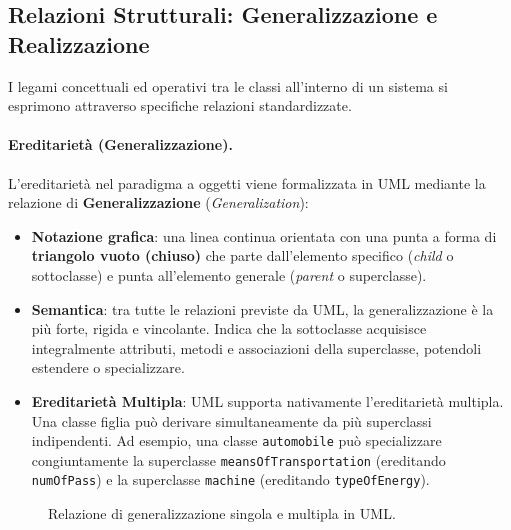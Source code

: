 \documentclass[12pt]{extarticle}
\newcommand{\cn}[1]{\makebox[\linewidth][c]{\textbf{#1}}}
\begin{document}
\newpage

\subsection{Relazioni Strutturali: Generalizzazione e Realizzazione}

\noindent I legami concettuali ed operativi tra le classi all'interno di un sistema si esprimono attraverso specifiche relazioni standardizzate.

\paragraph{Ereditarietà (Generalizzazione).}
L'ereditarietà nel paradigma a oggetti viene formalizzata in UML mediante la relazione di \textbf{Generalizzazione} (\textit{Generalization}):
\begin{itemize}
    \item \textbf{Notazione grafica}: una linea continua orientata con una punta a forma di \textbf{triangolo vuoto (chiuso)} che parte dall'elemento specifico (\textit{child} o sottoclasse) e punta all'elemento generale (\textit{parent} o superclasse).
    \item \textbf{Semantica}: tra tutte le relazioni previste da UML, la generalizzazione è la più forte, rigida e vincolante. Indica che la sottoclasse acquisisce integralmente attributi, metodi e associazioni della superclasse, potendoli estendere o specializzare.
    \item \textbf{Ereditarietà Multipla}: UML supporta nativamente l'ereditarietà multipla. Una classe figlia può derivare simultaneamente da più superclassi indipendenti. Ad esempio, una classe \texttt{automobile} può specializzare congiuntamente la superclasse \texttt{meansOfTransportation} (ereditando \texttt{numOfPass}) e la superclasse \texttt{machine} (ereditando \texttt{typeOfEnergy}).
\end{itemize}

\begin{figure}[H]
    \centering
{}
    \caption{Relazione di generalizzazione singola e multipla in UML.}
    \label{fig:uml_generalization_multiple}
\end{figure}
\end{document}

